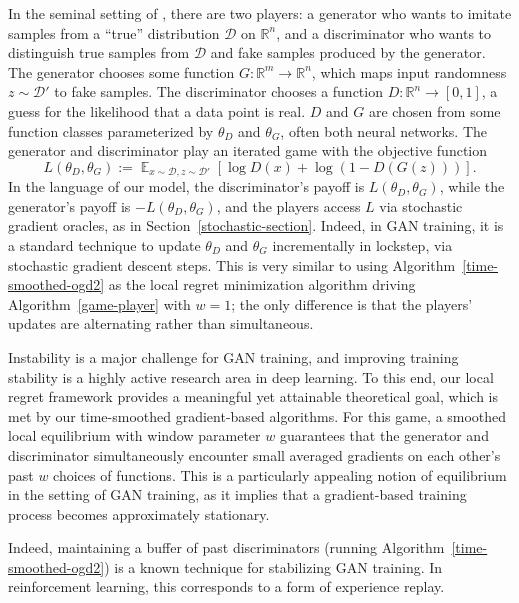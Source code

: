 \documentclass{article}
\def\D{{\mathcal D}}
\newcommand{\pa}[1]{\left(#1\right)}
\newcommand{\bra}[1]{\left[#1\right]}
\DeclareMathOperator*{\E}{\mathbb{E}}
\newcommand{\R}{\mathbb{R}}
\begin{document}
In the seminal setting of \cite{goodfellow2014generative}, there are two players: a generator who wants to imitate samples from a ``true'' distribution $\mathcal{D}$ on $\R^n$, and a discriminator who wants to distinguish true samples from $\D$ and fake samples produced by the generator. The generator chooses some function $G : \R^m \rightarrow \R^n$, which maps input randomness $z \sim \mathcal{D}'$ to fake samples. The discriminator chooses a function $D: \R^n \rightarrow [0,1]$, a guess for the likelihood that a data point is real. $D$ and $G$ are chosen from some function classes parameterized by $\theta_D$ and $\theta_G$, often both neural networks. The generator and discriminator play an iterated game with the objective function
\[ L(\theta_D, \theta_G) := \E_{x \sim \mathcal{D}, z \sim \mathcal{D}'} \bra{ \log D(x) + \log \pa{1 - D(G(z))} }. \]
In the language of our model, the discriminator's payoff is $L(\theta_D, \theta_G)$, while the generator's payoff is $-L(\theta_D, \theta_G)$, and the players access $L$ via stochastic gradient oracles, as in Section~\ref{stochastic-section}. Indeed, in GAN training, it is a standard technique to update $\theta_D$ and $\theta_G$ incrementally in lockstep, via stochastic gradient descent steps. This is very similar to using Algorithm~\ref{time-smoothed-ogd2} as the local regret minimization algorithm driving Algorithm~\ref{game-player} with $w = 1$; the only difference is that the players' updates are alternating rather than simultaneous.

Instability is a major challenge for GAN training, and improving training stability is a highly active research area in deep learning. To this end, our local regret framework provides a meaningful yet attainable theoretical goal, which is met by our time-smoothed gradient-based algorithms. For this game, a smoothed local equilibrium with window parameter $w$ guarantees that the generator and discriminator simultaneously encounter small averaged gradients on each other's past $w$ choices of functions. This is a particularly appealing notion of equilibrium in the setting of GAN training, as it implies that a gradient-based training process becomes approximately stationary.

Indeed, maintaining a buffer of past discriminators (running Algorithm~\ref{time-smoothed-ogd2}) is a known technique for stabilizing GAN training. \cite{metz2016unrolled} In reinforcement learning, this corresponds to a form of experience replay. \cite{pfau2016connecting}
\end{document}

